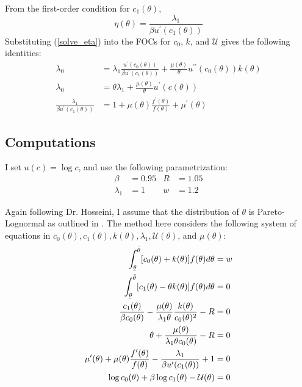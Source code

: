\documentclass[11pt]{article}
\newcommand{\ubar}[1]{\underaccent{\bar}{#1}}
\newcommand{\p}{\prime}
\newcommand{\U}{\mathcal{U}}
\begin{document}
From the first-order condition for \( c_1(\theta) \), 
\begin{equation}
    \eta(\theta) = \frac{\lambda_1}{\beta u^\p(c_1(\theta))} \label{solve_eta}
\end{equation}
Substituting (\ref{solve_eta}) into the FOCs for \( c_0 \), \( k \), and \( \U \) gives the following identities:
\begin{align}
    \lambda_0 &= \lambda_1 \frac{u^\p(c_0(\theta))}{\beta u^\p(c_1(\theta))} + \frac{\mu(\theta)}{\theta} u^{\p\p}(c_0(\theta))k(\theta) \label{foc_c0} \\
    \lambda_0 &= \theta\lambda_1 + \frac{\mu(\theta)}{\theta}u^\p(c(\theta)) \label{foc_k} \\
    \frac{\lambda_1}{\beta u^\p(c_1(\theta))} &= 1 + \mu(\theta)\frac{f^\p(\theta)}{f(\theta)} + \mu^\p(\theta) \label{foc_U}
\end{align}

\subsection{Computations} \label{s1_comp}

I set \( u(c) = \log c \), and use the following parametrization:
\begin{align*}
    \beta &= 0.95 & R &= 1.05 \\
    \lambda_1 &= 1 & w&= 1.2
\end{align*}

Again following Dr. Hosseini, I assume that the distribution of \( \theta \) is Pareto-Lognormal as outlined in \cite{reed2004double}. The method here considers the following system of equations in \( c_0(\theta), c_1(\theta), k(\theta), \lambda_1, \U(\theta) \), and \( \mu(\theta) \): 
\begin{align}
    \int_{\ubar{\theta}}^{\bar{\theta}}[c_0(\theta) + k(\theta)]f(\theta)d\theta &= w \\
    \int_{\ubar{\theta}}^{\bar{\theta}} [c_1(\theta) - \theta k(\theta)]f(\theta)d\theta &= 0 \\
    \frac{c_1(\theta)}{\beta c_0(\theta)} - \frac{\mu(\theta)}{\lambda_1 \theta}\frac{k(\theta)}{c_0(\theta)^2} - R &= 0 \label{foc_c0_par} \\
    \theta + \frac{\mu(\theta)}{\lambda_1\theta c_0(\theta)} - R &= 0 \label{foc_k_par} \\
    \mu^\p(\theta) + \mu(\theta)\frac{f^\p(\theta)}{f(\theta)} - \frac{\lambda_1}{\beta u^\p(c_1(\theta))} + 1 &= 0 \\
    \log c_0(\theta) + \beta\log c_1(\theta) - \U(\theta) &= 0 \label{pkc_par}
\end{align}
\end{document}
